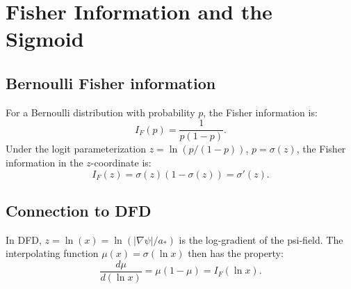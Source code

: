 \documentclass[11pt]{article}
\newcommand{\mufd}{\mu}
\begin{document}
\section{Fisher Information and the Sigmoid}

\subsection{Bernoulli Fisher information}

For a Bernoulli distribution with probability $p$, the Fisher
information is:
\begin{equation}
I_F(p) = \frac{1}{p(1-p)}.
\end{equation}
Under the logit parameterization $z = \ln(p/(1-p))$, $p = \sigma(z)$,
the Fisher information in the $z$-coordinate is:
\begin{equation}
I_F(z) = \sigma(z)(1 - \sigma(z)) = \sigma'(z).
\end{equation}

\subsection{Connection to DFD}

In DFD, $z = \ln(x) = \ln(|\nabla\psi|/a_*)$ is the log-gradient
of the psi-field. The interpolating function $\mufd(x) = \sigma(\ln x)$
then has the property:
\begin{equation}
\frac{d\mufd}{d(\ln x)} = \mufd(1 - \mufd) = I_F(\ln x).
\end{equation}
\end{document}
